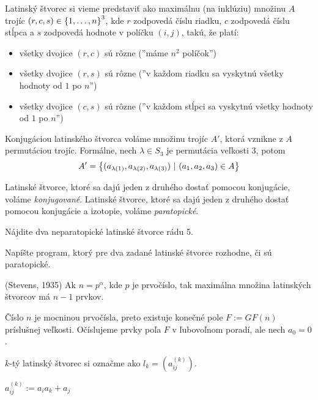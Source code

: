\begin{definition}
Latinský štvorec si vieme predstaviť ako maximálnu (na inklúziu) množinu $A$ trojíc $(r,c,s) \in \left\{1, \ldots, n\right\}^3$, 
kde $r$ zodpovedá číslu riadku, $c$ zodpovedá číslu stĺpca a $s$ zodpovedá hodnote v políčku $(i, j)$, 
takú, že platí:
\begin{itemize}
    \item všetky dvojice $(r, c)$ sú rôzne (''máme $n^2$ políčok'')
    \item všetky dvojice $(r, s)$ sú rôzne (''v každom riadku sa vyskytnú všetky hodnoty od $1$ po $n$'')
    \item všetky dvojice $(c, s)$ sú rôzne (''v každom stĺpci sa vyskytnú všetky hodnoty od $1$ po $n$'')
\end{itemize}  

Konjugáciou latinského štvorca voláme množinu trojíc $A'$, ktorá vznikne z $A$ permutáciou trojíc. Formálne,
nech $\lambda \in S_3$ je permutácia veľkosti $3$, potom $$A' = \left\{ (a_{\lambda(1)}, a_{\lambda(2)}, a_{\lambda(3)} ) ~|~ (a_1, a_2, a_3) \in A\right\}$$

Latinské štvorce, ktoré sa dajú jeden z druhého dostať pomocou konjugácie, voláme \emph{konjugované}.
Latinské štvorce, ktoré sa dajú jeden z druhého dostať pomocou konjugácie a izotopie, voláme \emph{paratopické}.

\end{definition}


\begin{toreview}
\begin{exercise}
Nájdite dva neparatopické latinské štvorce rádu 5.
\end{exercise}

\begin{exercise}
Napíšte program, ktorý pre dva zadané latinské štvorce rozhodne, či sú paratopické.
\end{exercise}
\end{toreview}

\begin{theorem}{(Stevens, 1935)}
\label{thm:stevens}
Ak $n = p^\alpha$, kde $p$ je prvočíslo, tak maximálna množina latinských štvorcov má $n-1$ prvkov.
\end{theorem}

\begin{construction}
Číslo $n$ je mocninou prvočísla, preto existuje konečné pole $F := GF(n)$ príslušnej veľkosti. 
Očíslujeme prvky poľa $F$ v ľubovoľnom poradí, ale nech $a_0 = 0$.

$k$-tý latinský štvorec si označme ako $l_k = \left(a_{ij}^{(k)}\right)$.

$a_{ij}^{(k)} := a_i a_k + a_j$
\end{construction}

